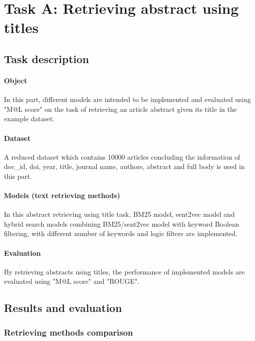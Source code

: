\documentclass[10pt,a4paper,fleqn]{report}
\begin{document}
	\section{Task A: Retrieving abstract using titles}
		\subsection{Task description}
			
			\paragraph{Object}
			In this part, different models are intended to be implemented and evaluated using "M@L score" on the task of retrieving an article abstract given its title in the example dataset.
			
			\paragraph{Dataset}
			A reduced dataset which contains 10000 articles concluding the information of doc\_id, doi, year, title, journal name, authors, abstract and full body is used in this part.
			
			\paragraph{Models (text retrieving methods)}
			In this abstract retrieving using title task, 
			BM25 model, sent2vec model and hybrid search models combining BM25/sent2vec model with keyword Boolean filtering, with different number of keywords and logic filters are implemented.
			
			\paragraph{Evaluation}
			By retrieving abstracts using titles, the performance of implemented models are evaluated using "M@L score" and "ROUGE".
		
		\subsection{Results and evaluation}
			\subsubsection{Retrieving methods comparison}
			
\end{document}
